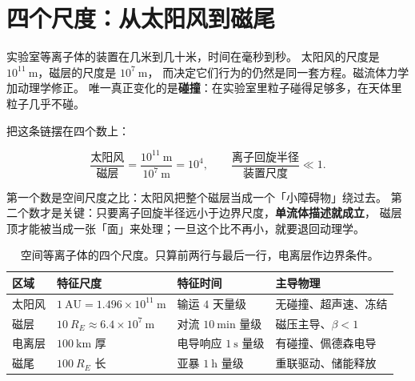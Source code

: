 
\section{四个尺度：从太阳风到磁尾}
\label{sec:app-ab-scales}
\setlength{\emergencystretch}{3em}

实验室等离子体的装置在几米到几十米，时间在毫秒到秒。
太阳风的尺度是 $10^{11}\ \mathrm{m}$，磁层的尺度是 $10^{7}\ \mathrm{m}$，
而决定它们行为的仍然是同一套方程。磁流体力学加动理学修正。
唯一真正变化的是\textbf{碰撞}：在实验室里粒子碰得足够多，在天体里粒子几乎不碰。

把这条链摆在四个数上：

\begin{equation}
\frac{\text{太阳风}}{\text{磁层}}=\frac{10^{11}\ \mathrm{m}}{10^{7}\ \mathrm{m}}
=10^{4},\qquad
\frac{\text{离子回旋半径}}{\text{装置尺度}}\ll 1 .
\label{eq:app-ab-scales}
\end{equation}

第一个数是空间尺度之比：太阳风把整个磁层当成一个「小障碍物」绕过去。
第二个数才是关键：只要离子回旋半径远小于边界尺度，\textbf{单流体描述就成立}，
磁层顶才能被当成一张「面」来处理；一旦这个比不再小，就要退回动理学。

\begin{table}[htbp]
\centering
\small
\caption{空间等离子体的四个尺度。只算前两行与最后一行，电离层作边界条件。}
\label{tab:app-ab-scales}
\begin{tabular}{p{2.4cm}p{3.4cm}p{3.4cm}p{4.2cm}}
\toprule
区域 & 特征尺度 & 特征时间 & 主导物理 \\
\midrule
太阳风 & $1\ \mathrm{AU}=1.496\times10^{11}\ \mathrm{m}$ & 输运 $4$ 天量级 & 无碰撞、超声速、冻结 \\
磁层 & $10\ R_E\approx6.4\times10^{7}\ \mathrm{m}$ & 对流 $10\ \mathrm{min}$ 量级 & 磁压主导、$\beta<1$ \\
电离层 & $100\ \mathrm{km}$ 厚 & 电导响应 $1\ \mathrm{s}$ 量级 & 有碰撞、佩德森电导 \\
磁尾 & $100\ R_E$ 长 & 亚暴 $1\ \mathrm{h}$ 量级 & 重联驱动、储能释放 \\
\bottomrule
\end{tabular}

\end{table}

